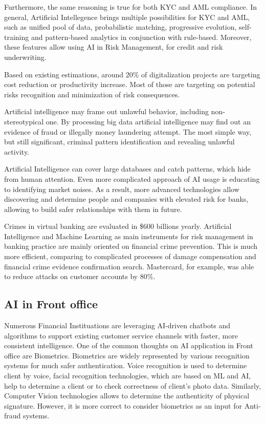 Furthermore, the same reasoning is true for both KYC and AML compliance.
In general, Artificial Intellegence brings multiple possibilities for KYC and AML, such as unified pool of data, probabilistic matching, progressive evolution, self-training and pattern-based analytics in conjunction with rule-based.
Moreover, these features allow using AI in Risk Management, for credit and risk underwriting.


Based on existing estimations, around 20\% of digitalization projects are targeting cost reduction or productivity increase.
Most of those are targeting on potential risks recognition and minimization of risk consequences.
\cite{ai_reality_hype}

Artificial intelligence may frame out unlawful behavior, including non-stereotypical one.
By processing big data artificial intelligence may find out an evidence of fraud or illegally money laundering attempt.
The most simple way, but still significant, criminal pattern identification and revealing unlawful activity.
 
Artificial Intelligence can cover large databases and catch patterns, which hide from human attention.
Even more complicated approach of AI usage is educating to identifying market noises.
As a result, more advanced technologies allow discovering and determine people and companies with elevated risk for banks, allowing to build safer relationships with them in future.

Crimes in virtual banking are evaluated in \$600 billions yearly.
Artificial Intelligence and Machine Learning as main instruments for risk management in banking practice are mainly oriented on financial crime prevention.
This is much more efficient, comparing to complicated processes of damage compensation and financial crime evidence confirmation search.
Mastercard, for example, was able to reduce attacks on customer accounts by 80\%.
\cite{ways_ai_transforming_bi}
 


\subsection{AI in Front office}
\label{subsec:ai_front_office}

Numerous Financial Instituations are leveraging AI-driven chatbots and algorithms to support existing customer service channels with faster, more consistent intelligence.
One of the common thoughts on AI application in Front office are Biometrics.
Biometrics are widely represented by various recognition systems for much safer authentication.
Voice recognition is used to determine client by voice, facial recognition technologies, which are based on ML and AI, help to determine a client or to check correctness of client's photo data.
Similarly, Computer Vision technologies allows to determine the authenticity of physical signature.
However, it is more correct to consider biometrics as an input for Anti-fraud systems. 

